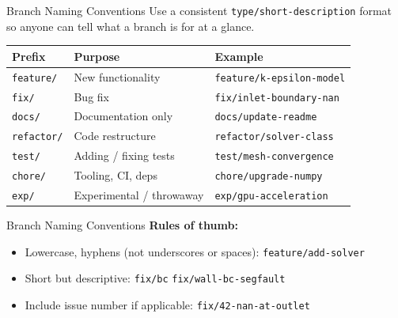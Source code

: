 \documentclass[aspectratio=169, 11pt]{beamer}
\begin{document}
\begin{frame}{Branch Naming Conventions}
  Use a consistent \texttt{type/short-description} format so anyone can tell what a branch is for at a glance.

  \vspace{0.5em}
  \begin{table}
    \centering
    \begin{tabular}{@{} l l l @{}}
      \toprule
      \textbf{Prefix} & \textbf{Purpose} & \textbf{Example} \\
      \midrule
      \texttt{feature/} & New functionality        & \texttt{feature/k-epsilon-model} \\
      \texttt{fix/}     & Bug fix                  & \texttt{fix/inlet-boundary-nan} \\
      \texttt{docs/}    & Documentation only       & \texttt{docs/update-readme} \\
      \texttt{refactor/}& Code restructure         & \texttt{refactor/solver-class} \\
      \texttt{test/}    & Adding / fixing tests    & \texttt{test/mesh-convergence} \\
      \texttt{chore/}   & Tooling, CI, deps        & \texttt{chore/upgrade-numpy} \\
      \texttt{exp/}     & Experimental / throwaway & \texttt{exp/gpu-acceleration} \\
      \bottomrule
    \end{tabular}
  \end{table}
\end{frame}

\begin{frame}{Branch Naming Conventions}
  \vspace{0.5em}
  \textbf{Rules of thumb:}
  \begin{itemize}
    \item Lowercase, hyphens (not underscores or spaces): \texttt{feature/add-solver} \checkmark
    \item Short but descriptive: \texttt{fix/bc} \texttimes \quad \texttt{fix/wall-bc-segfault} \checkmark
    \item Include issue number if applicable: \texttt{fix/42-nan-at-outlet}
  \end{itemize}
\end{frame}
\end{document}

